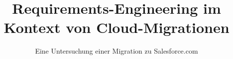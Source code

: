 \title{Requirements-Engineering
im Kontext von Cloud-Migrationen
}

\subtitle{Eine Untersuchung einer Migration zu Salesforce.com}









